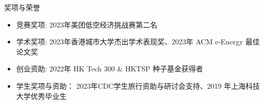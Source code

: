 \documentclass{resume} %
\begin{document}
\begin{rSection}{奖项与荣誉}

    \begin{itemize}
        \item 竞赛奖项: 2023年美团低空经济挑战赛第二名
        \item 学术奖项: 
        2023年香港城市大学杰出学术表现奖、2023年 ACM e-Energy 最佳论文奖
        \item 创业资助: 2022年 HK Tech 300 \& HKTSP 种子基金获得者
        \item 学生奖项与资助：
        2023年CDC学生旅行资助与研讨会支持、2019 年上海科技大学优秀毕业生

\end{itemize}
\end{rSection}
\end{document}
